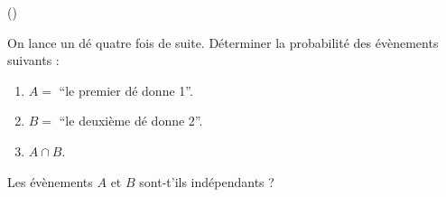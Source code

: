 \begin{exercice}\label{exo3-15} (\boringexo)

On lance un d\'e quatre fois de suite. D\'eterminer la probabilit\'e des \'ev\`enements suivants :

\begin{enumerate}
 \item $A =$ ``le premier d\'e donne 1''.
 \item $B =$ ``le deuxi\`eme d\'e donne 2''.
 \item $A \cap B$.
\end{enumerate}

Les \'ev\`enements $A$ et $B$ sont-t'ils ind\'ependants ?\\

\end{exercice}
